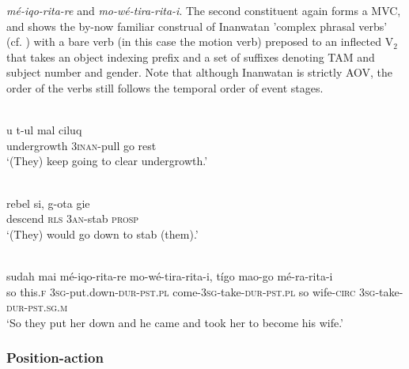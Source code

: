 \textit{mé-iqo-rita-re} and \textit{mo-wé-tira-rita-i}. The second constituent again forms a MVC, and shows the by-now familiar construal of Inanwatan 'complex phrasal verbs' (cf. \citealt[57]{devries2004}) with a bare verb (in this case the motion verb) preposed to an inflected V$_2$ that takes an object indexing prefix and a set of suffixes denoting TAM and subject number and gender. Note that although Inanwatan is strictly AOV, the order of the verbs still follows the temporal order of event stages.

\ea \label{Bunaq_60}
\\
\gll u t-ul mal ciluq \\
undergrowth 3\textsc{inan}-pull go rest \\
\glft ‘(They) keep going to clear undergrowth.’\\
\z

\ea \label{Bunaq_n1}
\\
\gll rebel si, g-ota gie \\
descend \textsc{rls} 3\textsc{an}-stab \textsc{prosp} \\
\glft ‘(They) would go down to stab (them).’\\ 
\z

\ea \label{Inan_20}
\\
\gll sudah mai mé-iqo-rita-re mo-wé-tira-rita-i, tígo mao-go mé-ra-rita-i \\
so this.\textsc{f} 3\textsc{sg}-put.down-\textsc{dur}-\textsc{pst}.\textsc{pl} come-3\textsc{sg}-take-\textsc{dur}-\textsc{pst}.\textsc{pl} so wife-\textsc{circ} 3\textsc{sg}-take-\textsc{dur}-\textsc{pst}.\textsc{sg}.\textsc{m} \\
\glft `So they put her down and he came and took her to become his wife.'\\ 
\z

\subsubsection{Position-action}\label{sec:position-action}

